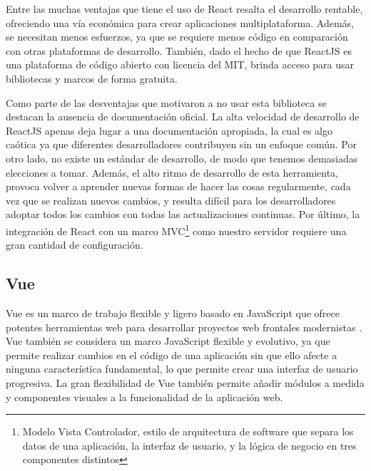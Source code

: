 Entre las muchas ventajas que tiene el uso de React resalta el desarrollo rentable, ofreciendo una v\'ia econ\'omica para crear aplicaciones multiplataforma. Adem\'as, se necesitan menos esfuerzos, ya que se requiere menos c\'odigo en comparaci\'on con otras plataformas de desarrollo. Tambi\'en, dado el hecho de que ReactJS es una plataforma de c\'odigo abierto con licencia del MIT, brinda acceso para usar bibliotecas y marcos de forma gratuita.

Como parte de las desventajas que motivaron a no usar esta biblioteca se destacan la ausencia de documentaci\'on oficial. La alta velocidad de desarrollo de ReactJS apenas deja lugar a una documentaci\'on apropiada, la cual es algo ca\'otica ya que diferentes desarrolladores contribuyen sin un enfoque com\'un. Por otro lado, no existe un est\'andar de desarrollo, de modo que tenemos demasiadas elecciones a tomar. Adem\'as, el alto ritmo de desarrollo de esta herramienta, provoca volver a aprender nuevas formas de hacer las cosas regularmente, cada vez que se realizan nuevos cambios, y resulta dif\'icil para los desarrolladores adoptar todos los cambios con todas las actualizaciones continuas. Por \'ultimo, la integraci\'on de React con un marco MVC\footnote{Modelo Vista Controlador, estilo de arquitectura de software que separa los datos de una aplicaci\'on, la interfaz de usuario, y la l\'ogica de negocio en tres componentes distintos} como nuestro servidor requiere una gran cantidad de configuraci\'on.


\subsection{Vue}
Vue es un marco de trabajo flexible y ligero basado en JavaScript que ofrece potentes herramientas web para desarrollar proyectos web frontales modernistas \cite{vue}. Vue tambi\'en se considera un marco JavaScript flexible y evolutivo, ya que permite realizar cambios en el c\'odigo de una aplicaci\'on sin que ello afecte a ninguna caracter\'istica fundamental, lo que permite crear una interfaz de usuario progresiva. La gran flexibilidad de Vue tambi\'en permite a\~nadir m\'odulos a medida y componentes visuales a la funcionalidad de la aplicaci\'on web.

